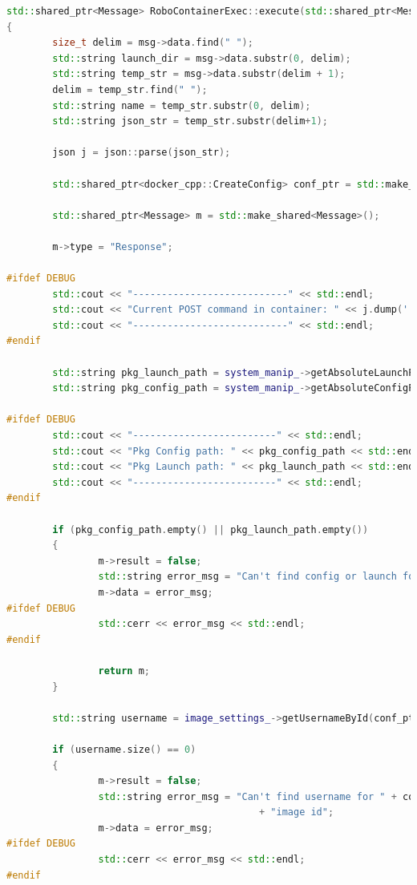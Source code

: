 \documentclass[a4paper, 14pt]{extreport}
\begin{document}
\begin{lstlisting}[language=C++, frame=single, xleftmargin=15pt, caption={Определение методов класса RoboContainerExec},label=DescriptiveLabel]
std::shared_ptr<Message> RoboContainerExec::execute(std::shared_ptr<Message> msg)
{
        size_t delim = msg->data.find(" ");
        std::string launch_dir = msg->data.substr(0, delim);
        std::string temp_str = msg->data.substr(delim + 1);
        delim = temp_str.find(" ");
        std::string name = temp_str.substr(0, delim);
        std::string json_str = temp_str.substr(delim+1);

        json j = json::parse(json_str);

        std::shared_ptr<docker_cpp::CreateConfig> conf_ptr = std::make_shared<docker_cpp::CreateConfig>(j.get<docker_cpp::CreateConfig>());

        std::shared_ptr<Message> m = std::make_shared<Message>();

        m->type = "Response";

#ifdef DEBUG
        std::cout << "---------------------------" << std::endl;
        std::cout << "Current POST command in container: " << j.dump(' ') << std::endl;
        std::cout << "---------------------------" << std::endl;
#endif

        std::string pkg_launch_path = system_manip_->getAbsoluteLaunchPath(launch_dir);
        std::string pkg_config_path = system_manip_->getAbsoluteConfigPath(launch_dir);

#ifdef DEBUG
        std::cout << "-------------------------" << std::endl;
        std::cout << "Pkg Config path: " << pkg_config_path << std::endl;
        std::cout << "Pkg Launch path: " << pkg_launch_path << std::endl;
        std::cout << "-------------------------" << std::endl;
#endif

        if (pkg_config_path.empty() || pkg_launch_path.empty())
        {
                m->result = false;
                std::string error_msg = "Can't find config or launch folder with " + launch_dir + " name!";
                m->data = error_msg;
#ifdef DEBUG
                std::cerr << error_msg << std::endl;
#endif

                return m;
        }

        std::string username = image_settings_->getUsernameById(conf_ptr->Image);

        if (username.size() == 0)
        {
                m->result = false;
                std::string error_msg = "Can't find username for " + conf_ptr->Image 
                                            + "image id";
                m->data = error_msg;
#ifdef DEBUG
                std::cerr << error_msg << std::endl;
#endif


\end{lstlisting}
\end{document}
